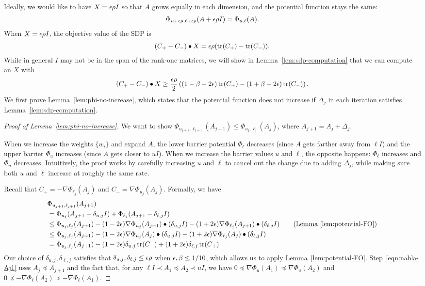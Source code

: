 Ideally, we would like to have $X = \epsilon \rho I$ so that $A$ grows equally in each dimension, and the potential function stays the same:
\[
\Phi_{u+\epsilon\rho,\ell+\epsilon\rho}(A+\epsilon\rho I) = \Phi_{u,\ell}(A).
\]
When $X = \epsilon \rho I$, the objective value of the SDP is
\[
(C_+ - C_-) \bullet X = \epsilon \rho (\operatorname{tr}(C_+) - \operatorname{tr}(C_-)).
\]
While in general $I$ may not be in the span of the rank-one matrices, we will show in Lemma~\ref{lem:sdp-computation} that we can compute an $X$ with
\[
(C_+ - C_-) \bullet X \ge \frac{\epsilon \rho}{2} \left((1-\beta-2\epsilon)\operatorname{tr}(C_+) - (1+\beta+2\epsilon)\operatorname{tr}(C_-)\right).
\]
We first prove Lemma~\ref{lem:phi-no-increase}, which states that the potential function does not increase if $\Delta_j$ in each iteration satisfies Lemma~\ref{lem:sdp-computation}.

\begin{proof}[Proof of Lemma~\ref{lem:phi-no-increase}]
We want to show $\Phi_{u_{j+1},\ell_{j+1}}(A_{j+1}) \le \Phi_{u_{j},\ell_{j}}(A_{j})$, where $A_{j+1} = A_j + \Delta_j$.

When we increase the weights $\{w_i\}$ and expand $A$, the lower barrier potential $\Phi_\ell$ decreases (since $A$ gets farther away from $\ell I$) and the upper barrier $\Phi_u$ increases (since $A$ gets closer to $u I$).
When we increase the barrier values $u$ and $\ell$, the opposite happens: $\Phi_\ell$ increases and $\Phi_u$ decreases.
Intuitively, the proof works by carefully increasing $u$ and $\ell$ to cancel out the change due to adding $\Delta_j$, while making sure both $u$ and $\ell$ increase at roughly the same rate.

Recall that $C_+ = -\nabla \Phi_{\ell_j} (A_j)$ and $C_- = \nabla \Phi_{u_j} (A_j)$.
Formally, we have
\begin{align}
& \Phi_{u_{j+1},\ell_{j+1}}(A_{j+1}) \notag \\
& = \Phi_{u_j}(A_{j+1}-\delta_{u,j} I) + \Phi_{\ell_j}(A_{j+1}-\delta_{\ell,j} I) \notag \\
& \le \Phi_{u_j,\ell_j}(A_{j+1}) - (1-2\eps) \nabla \Phi_{u_j}(A_{j+1}) \bullet (\delta_{u,j} I) - (1+2\eps) \nabla \Phi_{\ell_j}(A_{j+1}) \bullet (\delta_{\ell,j} I) \tag{Lemma~\ref{lem:potential-FO}}\\
& \le \Phi_{u_j,\ell_j}(A_{j+1}) - (1-2\eps) \nabla \Phi_{u_j}(A_{j}) \bullet (\delta_{u,j} I) - (1+2\eps) \nabla \Phi_{\ell_j}(A_{j}) \bullet (\delta_{\ell,j} I) \label{eqn:nabla-Aj1} \\
& = \Phi_{u_j,\ell_j}(A_{j+1}) - (1-2\eps) \delta_{u,j} \tr(C_-) + (1+2\eps) \delta_{\ell,j} \tr(C_+) \label{eqn:phi-change-1}.
\end{align}
Our choice of $\delta_{u,j}, \delta_{\ell,j}$ satisfies that $\delta_{u,j}, \delta_{\ell,j} \le \epsilon \rho$ when $\epsilon, \beta \le 1/10$, which allows us to apply Lemma~\ref{lem:potential-FO}.
Step~\eqref{eqn:nabla-Aj1} uses $A_{j} \preceq A_{j+1}$ and the fact that, for any $\ell I \prec A_1 \preceq A_2 \prec u I$, we have $0 \preceq \nabla \Phi_u (A_1) \preceq \nabla \Phi_u (A_2)$ and $0 \preceq -\nabla \Phi_\ell (A_2) \preceq -\nabla \Phi_\ell (A_1)$.


\end{proof}
